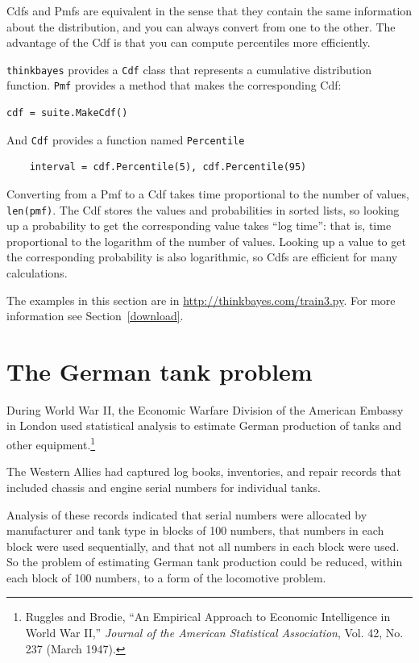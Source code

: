 \documentclass[12pt]{book}
\begin{document}
Cdfs and Pmfs are equivalent in the sense that they contain the
same information about the distribution, and you can always convert
from one to the other.  The advantage of the Cdf is that you can
compute percentiles more efficiently.

{\tt thinkbayes} provides a {\tt Cdf} class that represents a
cumulative distribution function.  {\tt Pmf} provides a method
that makes the corresponding Cdf:

\begin{verbatim}
cdf = suite.MakeCdf()
\end{verbatim}

And {\tt Cdf} provides a function named \verb"Percentile"

\begin{verbatim}
    interval = cdf.Percentile(5), cdf.Percentile(95)
\end{verbatim}

Converting from a Pmf to a Cdf takes time proportional to the number
of values, {\tt len(pmf)}.  The Cdf stores the values and
probabilities in sorted lists, so looking up a probability to get the
corresponding value takes ``log time'': that is, time proportional to
the logarithm of the number of values.  Looking up a value to get the
corresponding probability is also logarithmic, so Cdfs are efficient
for many calculations.

The examples in this section are in \url{http://thinkbayes.com/train3.py}.
  For more information
see Section~\ref{download}.


\section{The German tank problem}

During World War II, the Economic Warfare Division of the American
Embassy in London used statistical analysis to estimate German
production of tanks and other equipment.\footnote{Ruggles and Brodie,
  ``An Empirical Approach to Economic Intelligence in World War II,''
  {\em Journal of the American Statistical Association}, Vol. 42,
  No. 237 (March 1947).}

The Western Allies had captured log books, inventories, and repair
records that included chassis and engine serial numbers for individual
tanks.

Analysis of these records indicated that serial numbers were allocated
by manufacturer and tank type in blocks of 100 numbers, that numbers
in each block were used sequentially, and that not all numbers in each
block were used.  So the problem of estimating German tank production
could be reduced, within each block of 100 numbers, to a form of the
locomotive problem.
\end{document}
